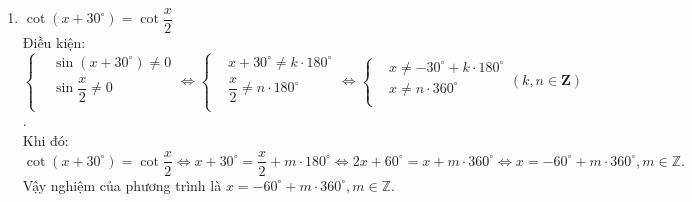 \begin{vd}
{\begin{enumerate}
\begin{eqnarray*}
				      &\Leftrightarrow& \tan\left(3x-20^\circ\right)=\tan\left(90^\circ-2x-15^\circ\right)\\
				      &\Leftrightarrow&\tan\left(3x-20^\circ\right)=\tan\left(75^\circ-2x\right)\\
				      &\Leftrightarrow&3x-20^\circ=75^\circ-2x+k180^\circ\\
				      &\Leftrightarrow&x=19^\circ+k36^\circ, k\in\mathbb{Z}.
			      \end{eqnarray*}
			\item $\cot\left(x+30^\circ\right)=\cot\dfrac{x}{2}$\\
			      Điều kiện: $ \left\{\begin{aligned}
					       & \sin\left(x+30^\circ\right)\neq 0 \\
					       & \sin\dfrac{x}{2}\neq 0            \\
				      \end{aligned}\right.\Leftrightarrow \left\{\begin{aligned}
					       & x+30^{\circ} \neq k \cdot 180^{\circ} \\
					       & \dfrac{x}{2} \neq n \cdot 180^{\circ} \\
				      \end{aligned}\right.\Leftrightarrow \left\{\begin{aligned}
					       & x\neq -30^\circ+k \cdot 180^{\circ} \\
					       & x\neq n\cdot 360^\circ              \\
				      \end{aligned}\right. \left(k, n\in\mathbf{Z}\right)$.\\
			      Khi đó:
			      $$\cot\left(x+30^\circ\right)=\cot\dfrac{x}{2} \Leftrightarrow x+30^\circ=\dfrac{x}{2}+m \cdot 180^\circ \Leftrightarrow 2 x+60^\circ=x+m \cdot 360^\circ \Leftrightarrow x=-60^\circ+m \cdot 360^\circ, m \in \mathbb{Z}.
			      $$
			      Vậy nghiệm của phương trình là $x=-60^\circ+m \cdot 360^\circ, m \in \mathbb{Z}$.
		\end{enumerate}
	}
\end{vd}

